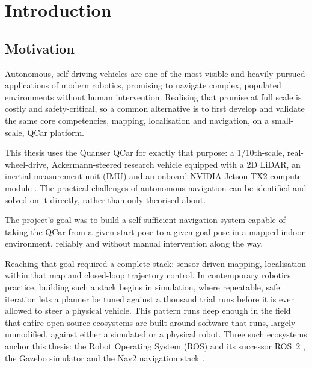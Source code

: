 \chapter{Introduction}
\label{ch:introduction}


\section{Motivation}
\label{sec:motivation}

Autonomous, self-driving vehicles are one of the most visible and
heavily pursued applications of modern robotics, promising to
navigate complex, populated environments without human intervention.
Realising that promise at full scale is costly and safety-critical,
so a common alternative is to first develop and validate the same
core competencies, mapping, localisation and navigation, on a
small-scale, QCar platform.

This thesis uses the Quanser QCar for exactly that purpose: a
1/10th-scale, real-wheel-drive, Ackermann-steered research vehicle
equipped with a 2D LiDAR, an inertial measurement unit (IMU) and an
onboard NVIDIA Jetson TX2 compute module \cite{quanser2023qcar}. The
practical challenges of autonomous navigation can be identified and
solved on it directly, rather than only theorised about.

The project's goal was to build a self-sufficient navigation system
capable of taking the QCar from a given start pose to a given goal
pose in a mapped indoor environment, reliably and without manual
intervention along the way.

Reaching that goal required a complete stack: sensor-driven mapping,
localisation within that map and closed-loop trajectory control. In
contemporary robotics practice, building such a stack begins in
simulation, where repeatable, safe iteration lets a planner be tuned
against a thousand trial runs before it is ever allowed to steer a
physical vehicle. This pattern runs deep enough in the field that
entire open-source ecosystems are built around software that runs,
largely unmodified, against either a simulated or a physical robot.
Three such ecosystems anchor this thesis: the Robot Operating System
(ROS) and its successor ROS~2 \cite{quigley2009ros,macenski2022ros2},
the Gazebo simulator \cite{koenig2004gazebo} and the Nav2
navigation stack \cite{macenski2020nav2}.

